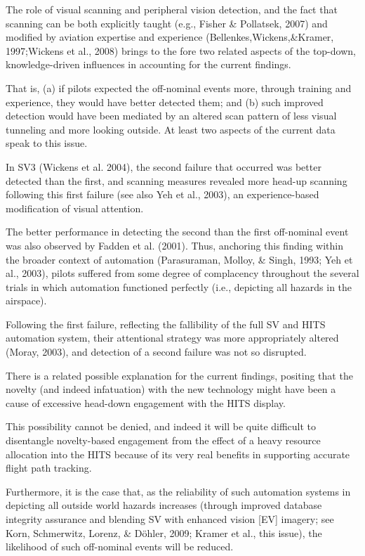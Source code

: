 \documentclass[utf8,bachelor,manualbib]{gradu3}
\begin{document}
The role of visual scanning and peripheral vision detection, and the fact that scanning can be both explicitly taught (e.g., Fisher \& Pollatsek, 2007) and modified by aviation expertise and experience (Bellenkes,Wickens,\&Kramer, 1997;Wickens et al., 2008) brings to the fore two related aspects of the top-down, knowledge-driven influences in accounting for the current findings.

That is, (a) if pilots expected the off-nominal events more, through training and experience, they would have better detected them; and (b) such improved detection would have been mediated by an altered scan pattern of less visual tunneling and more looking outside. At least two aspects of the current data speak to this issue.

In SV3 (Wickens et al. 2004), the second failure that occurred was better detected than the first, and scanning measures revealed more head-up scanning following this first failure (see also Yeh et al., 2003), an experience-based modification of visual attention.

The better performance in detecting the second than the first off-nominal event was also observed by Fadden et al. (2001). Thus, anchoring this finding within the broader context of automation (Parasuraman, Molloy, \& Singh, 1993; Yeh et al., 2003), pilots suffered from some degree of complacency throughout the several trials in which automation functioned perfectly (i.e., depicting all hazards in the airspace).

Following the first failure, reflecting the fallibility of the full SV and HITS automation system, their attentional strategy was more appropriately altered (Moray, 2003), and detection of a second failure was not so disrupted.







There is a related possible explanation for the current findings, positing that the novelty (and indeed infatuation) with the new technology might have been a cause of excessive head-down engagement with the HITS display.

This possibility cannot be denied, and indeed it will be quite difficult to disentangle novelty-based engagement from the effect of a heavy resource allocation into the HITS because of its very real benefits in supporting accurate flight path tracking. 

Furthermore, it is the case that, as the reliability of such automation systems in depicting all outside world hazards increases (through improved database integrity assurance and blending SV with enhanced vision [EV] imagery; see Korn, Schmerwitz, Lorenz, \& Döhler, 2009; Kramer et al., this issue), the likelihood of such off-nominal events will be reduced.
\end{document}
